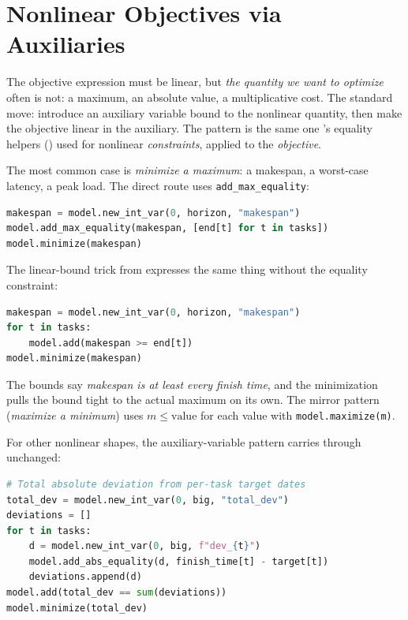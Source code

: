 \section{Nonlinear Objectives via Auxiliaries}\label{sec:8.2}

The objective expression must be linear, but \emph{the quantity we want
to optimize} often is not: a maximum, an absolute value, a
multiplicative cost. The standard move: introduce an auxiliary variable
bound to the nonlinear quantity, then make the objective linear in the
auxiliary. The pattern is the same one 's equality helpers
() used for nonlinear \emph{constraints}, applied to the
\emph{objective}.

The most common case is \emph{minimize a maximum}: a makespan, a
worst-case latency, a peak load. The direct route uses
\lstinline!add_max_equality!:

\begin{lstlisting}[language=Python]
makespan = model.new_int_var(0, horizon, "makespan")
model.add_max_equality(makespan, [end[t] for t in tasks])
model.minimize(makespan)
\end{lstlisting}

The linear-bound trick from  expresses the same thing without the
equality constraint:

\begin{lstlisting}[language=Python]
makespan = model.new_int_var(0, horizon, "makespan")
for t in tasks:
    model.add(makespan >= end[t])
model.minimize(makespan)
\end{lstlisting}

The bounds say \emph{makespan is at least every finish time}, and the
minimization pulls the bound tight to the actual maximum on its own. The
mirror pattern (\emph{maximize a minimum}) uses
\(m \le \text{value}\) for each value with
\lstinline!model.maximize(m)!.

For other nonlinear shapes, the auxiliary-variable pattern carries
through unchanged:

\begin{lstlisting}[language=Python]
# Total absolute deviation from per-task target dates
total_dev = model.new_int_var(0, big, "total_dev")
deviations = []
for t in tasks:
    d = model.new_int_var(0, big, f"dev_{t}")
    model.add_abs_equality(d, finish_time[t] - target[t])
    deviations.append(d)
model.add(total_dev == sum(deviations))
model.minimize(total_dev)
\end{lstlisting}


